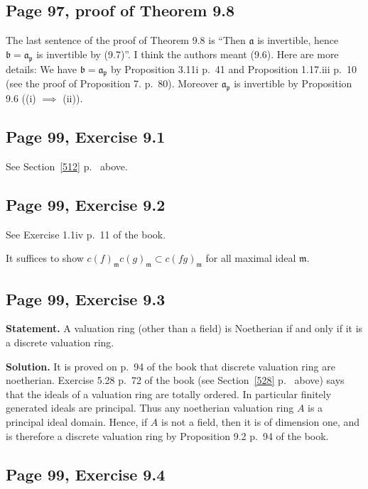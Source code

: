 \documentclass[parskip=half,fontsize=12pt]{scrartcl}%
\newcommand{\mf}{\mathfrak}
\newcommand{\aaa}{\mf a}
\newcommand{\bbb}{\mf b}
\newcommand{\mmm}{\mf m}
\newcommand{\ppp}{\mf p}
\begin{document}
\subsection{Page 97, proof of Theorem 9.8}%

The last sentence of the proof of Theorem 9.8 is ``Then $\aaa$ is invertible, hence $\bbb=\aaa_\ppp$ is invertible by (9.7)''. I think the authors meant (9.6). Here are more details: We have $\bbb=\aaa_\ppp$ by Proposition 3.11i p.~41 and Proposition 1.17.iii p.~10 (see the proof of Proposition 7. p.~80). Moreover $\aaa_\ppp$ is invertible by Proposition 9.6 ((i) $\implies$ (ii)). 

\subsection{Page 99, Exercise 9.1}%

See Section~\ref{512} p.~\pageref{512} above.

\subsection{Page 99, Exercise 9.2}%

See Exercise 1.1iv p.~11 of the book. 

It suffices to show $c(f)_\mmm c(g)_\mmm\subset c(fg)_\mmm$ for all maximal ideal $\mmm$. 

\subsection{Page 99, Exercise 9.3}%

\textbf{Statement.} A valuation ring (other than a field) is Noetherian if and only if it is a discrete valuation ring.

\textbf{Solution.} It is proved on p.~94 of the book that discrete valuation ring are noetherian. Exercise 5.28 p.~72 of the book (see Section~\ref{528} p.~\pageref{528} above) says that the ideals of a valuation ring are totally ordered. In particular finitely generated ideals are principal. Thus any noetherian valuation ring $A$ is a principal ideal domain. Hence, if $A$ is not a field, then it is of dimension one, and is therefore a discrete valuation ring by Proposition 9.2 p.~94 of the book.

\subsection{Page 99, Exercise 9.4}%
\end{document}
